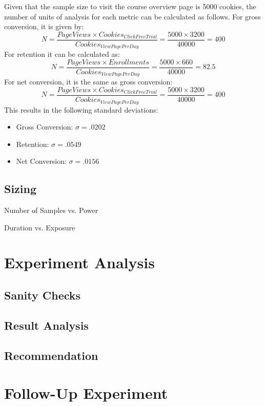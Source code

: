 \documentclass[11pt]{article} %
\begin{document}
\noindent Given that the sample size to visit the course overview page is 5000 cookies, the number of units of analysis for each metric can be calculated as follows. For gross conversion, it is given by:
\begin{equation}
     N = \frac{PageViews \times Cookies_{ClickFreeTrial}}{Cookies_{ViewPagePerDay}} = \frac{5000 \times 3200}{40000} = 400
\end{equation}
For retention it can be calculated as:
\begin{equation}
     N = \frac{PageViews \times Enrollments}{Cookies_{ViewPagePerDay}} = \frac{5000 \times 660}{40000} = 82.5
\end{equation}
For net conversion, it is the same as gross conversion:
\begin{equation}
     N = \frac{PageViews \times Cookies_{ClickFreeTrial}}{Cookies_{ViewPagePerDay}} = \frac{5000 \times 3200}{40000} = 400
\end{equation}
This results in the following standard deviations:
\begin{itemize}
\item Gross Conversion: $\sigma = .0202$
\item Retention: $\sigma = .0549$
\item Net Conversion: $\sigma =  .0156$
\end{itemize}


\subsection{Sizing}
Number of Samples vs. Power\medskip

\noindent Duration vs. Exposure

\section{Experiment Analysis}
\subsection{Sanity Checks}

\subsection{Result Analysis}

\subsection{Recommendation}

\section{Follow-Up Experiment}
\end{document}
